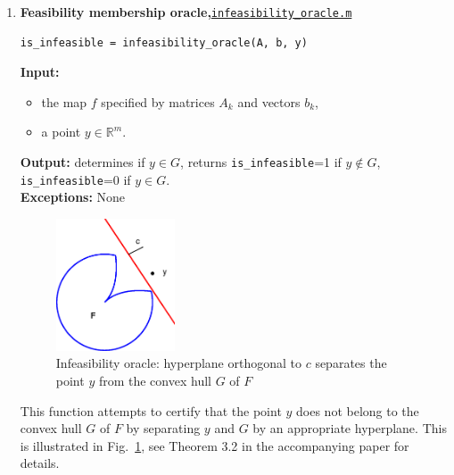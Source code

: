 \documentclass[a4paper]{article}
\theoremstyle{definition}
\begin{document}
\begin{enumerate}
\item {\bf Feasibility membership oracle,\hskip 6pt}\underline{\tt  infeasibility\_oracle.m}
\begin{verbatim}
is_infeasible = infeasibility_oracle(A, b, y)
\end{verbatim}
{\bf Input:}
\begin{itemize}
\item the map $f$ specified by matrices $A_k$ and vectors $b_k$,
\item a point $y\in\mathbb{R}^m$.
\end{itemize}
{\bf Output:} determines if $y\in G$, returns {\tt is\_infeasible}=1 if $y\notin G$, {\tt is\_infeasible}=0 if $y\in G$.\\
{\bf Exceptions:} None

\begin{figure}[H]
	\centering\includegraphics[width=100pt]{fig/infeasibility_oracle}
	\caption{Infeasibility oracle: hyperplane orthogonal to $c$ separates the point $y$ from the convex hull $G$ of $F$}
\label{fig:one}
\end{figure}

This function attempts to certify that the point $y$ does not belong to the convex hull $G$ of $F$ by separating $y$ and $G$ by an appropriate hyperplane.
This is illustrated in Fig.~\ref{fig:one}, see Theorem 3.2 in the accompanying paper for details.


\end{enumerate}
\end{document}
